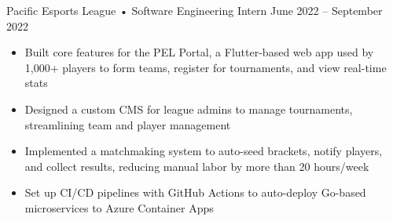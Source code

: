 \documentclass[9pt]{developercv} %
\begin{document}
\begin{entrylist}
{\begin{itemize}[noitemsep,topsep=0pt,parsep=0pt,partopsep=0pt, leftmargin=10pt]
        \end{itemize}}
	\entry
		{}
		{Pacific Esports League • Software Engineering Intern}
		{June 2022 – September 2022}
		{\vspace{-8pt}
        \begin{itemize}[noitemsep,topsep=0pt,parsep=0pt,partopsep=0pt, leftmargin=10pt]
            \item Built core features for the PEL Portal, a Flutter-based web app used by 1,000+ players to form teams, register for tournaments, and view real-time stats
            \item Designed a custom CMS for league admins to manage tournaments, streamlining team and player management
            \item Implemented a matchmaking system to auto-seed brackets, notify players, and collect results, reducing manual labor by more than 20 hours/week
            \item Set up CI/CD pipelines with GitHub Actions to auto-deploy Go-based microservices to Azure Container Apps
        \end{itemize}}
\end{entrylist}
\vspace{-10pt}
\end{document}
